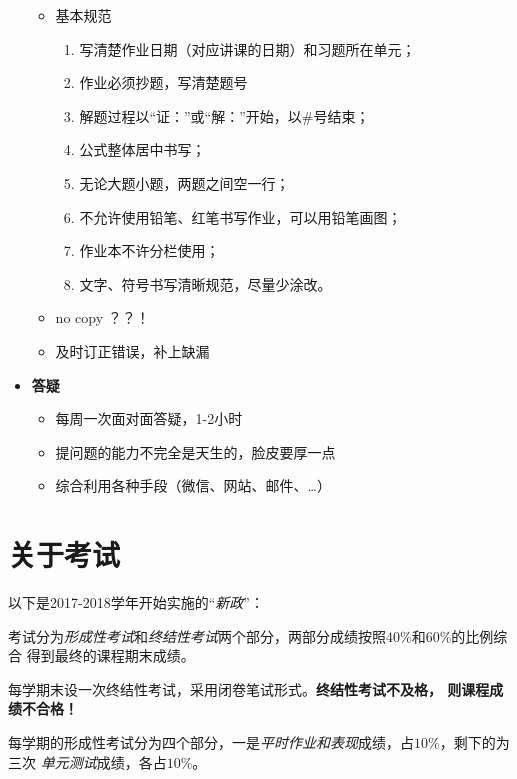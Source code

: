 \begin{itemize}
\begin{figure}[h]
\begin{center}
  		\label{fig:0.2}
  	\end{center}
  \end{figure}
  \begin{itemize}
    \item 基本规范
    \begin{enumerate}
      \item 写清楚作业日期（对应讲课的日期）和习题所在单元；
      \item 作业必须抄题，写清楚题号
	  \item 解题过程以“证：”或“解：”开始，以$\#$号结束；
	  \item 公式整体居中书写；
	  \item 无论大题小题，两题之间空一行；
	  \item 不允许使用铅笔、红笔书写作业，可以用铅笔画图；
	  \item 作业本不许分栏使用；
	  \item 文字、符号书写清晰规范，尽量少涂改。
    \end{enumerate}    
    \item no copy ？？！
    \item 及时订正错误，补上缺漏
  \end{itemize}
	\item {\bf 答疑}
	  \begin{itemize}
	    \item 每周一次面对面答疑，1-2小时
	    \item 提问题的能力不完全是天生的，脸皮要厚一点
	    \item 综合利用各种手段（微信、网站、邮件、\ldots）
	  \end{itemize}
\end{itemize}

\section{关于考试}

以下是2017-2018学年开始实施的“{\it 新政}”：

考试分为{\it 形成性考试}和{\it 终结性考试}两个部分，两部分成绩按照$40\%$和$60\%$的比例综合
得到最终的课程期末成绩。

每学期末设一次终结性考试，采用闭卷笔试形式。{\color{red}\bf 终结性考试不及格，
则课程成绩不合格！}

每学期的形成性考试分为四个部分，一是{\it 平时作业和表现}成绩，占$10\%$，剩下的为三次
{\it 单元测试}成绩，各占$10\%$。


